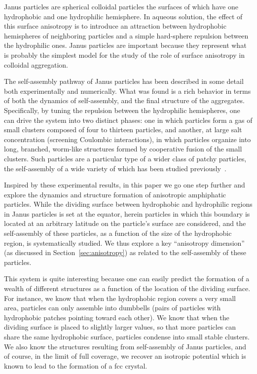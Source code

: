 Janus particles are spherical colloidal particles the surfaces of which have one hydrophobic and one hydrophilic hemisphere.
In aqueous solution, the effect of this surface anisotropy is to introduce an attraction between hydrophobic hemispheres of neighboring particles and a simple hard-sphere repulsion between the hydrophilic ones.
Janus particles are important because they represent what is probably the simplest model for the study of the role of surface anisotropy in colloidal aggregation. 

The self-assembly pathway of Janus particles has been described in some detail~\cite{Hong2} both experimentally and numerically.  
What was found is a rich behavior in terms of both the dynamics of self-assembly, and the final structure of the aggregates.
Specifically, by tuning the repulsion between the hydrophilic hemispheres, one can drive the system into two distinct phases: one in which particles form a gas of small clusters composed of four to thirteen particles, and another, at large salt concentration (screening Coulombic interactions), in which particles organize into long, branched, worm-like structures formed by cooperative fusion of the small clusters.  
Such particles are a particular type of a wider class of patchy particles, the self-assembly of a wide variety of which has been studied previously~\cite{glotzer,sciortino}.

Inspired by these experimental results, in this paper we go one step further and explore the dynamics and structure formation of anisotropic amphiphatic particles.
While the dividing surface  between hydrophobic and hydrophilic regions in Janus particles is set at the equator, herein particles in which this boundary is located at an arbitrary latitude on the particle's surface are considered, and the self-assembly of these particles, as a function of the size of the hydrophobic region, is systematically studied.
We thus explore a key ``anisotropy dimension'' (as discussed in Section~\ref{sec:anisotropy}) as related to the self-assembly of these particles.

This system is quite interesting because one can easily predict the formation of a wealth of different structures  as a function of the location of the dividing surface. 
For instance, we know that when the hydrophobic  region covers a very small area, particles  can only assemble into dumbbells (pairs of particles with hydrophobic patches pointing toward each other). 
We know that when the dividing surface is placed to slightly larger values, so that more particles can share the same hydrophobic surface, particles condense into small stable  clusters.
We also know the structures resulting from self-assembly of Janus particles, and of course, in the limit  of full coverage, we recover an isotropic potential which is known to lead to the formation of a fcc crystal. 

